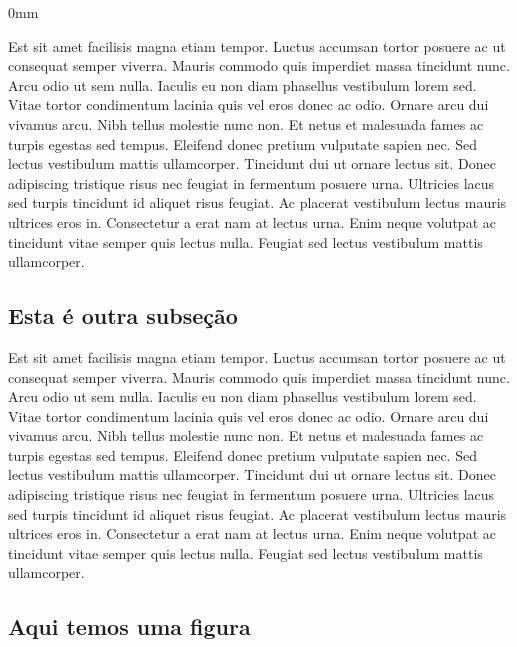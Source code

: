 \documentclass[./main.tex]{subfiles}
\begin{document}
\begin{adjustwidth}{\bodytab}{0mm}
\par Est sit amet facilisis magna etiam tempor. Luctus accumsan tortor posuere ac ut consequat semper viverra. Mauris commodo quis imperdiet massa tincidunt nunc. Arcu odio ut sem nulla. Iaculis eu non diam phasellus vestibulum lorem sed. Vitae tortor condimentum lacinia quis vel eros donec ac odio. Ornare arcu dui vivamus arcu. Nibh tellus molestie nunc non. Et netus et malesuada fames ac turpis egestas sed tempus. Eleifend donec pretium vulputate sapien nec. Sed lectus vestibulum mattis ullamcorper. Tincidunt dui ut ornare lectus sit. Donec adipiscing tristique risus nec feugiat in fermentum posuere urna. Ultricies lacus sed turpis tincidunt id aliquet risus feugiat. Ac placerat vestibulum lectus mauris ultrices eros in. Consectetur a erat nam at lectus urna. Enim neque volutpat ac tincidunt vitae semper quis lectus nulla. Feugiat sed lectus vestibulum mattis ullamcorper.

\subsection{Esta é outra subseção}  \label{chp1:sec1:sub2}

\par Est sit amet facilisis magna etiam tempor. Luctus accumsan tortor posuere ac ut consequat semper viverra. Mauris commodo quis imperdiet massa tincidunt nunc. Arcu odio ut sem nulla. Iaculis eu non diam phasellus vestibulum lorem sed. Vitae tortor condimentum lacinia quis vel eros donec ac odio. Ornare arcu dui vivamus arcu. Nibh tellus molestie nunc non. Et netus et malesuada fames ac turpis egestas sed tempus. Eleifend donec pretium vulputate sapien nec. Sed lectus vestibulum mattis ullamcorper. Tincidunt dui ut ornare lectus sit. Donec adipiscing tristique risus nec feugiat in fermentum posuere urna. Ultricies lacus sed turpis tincidunt id aliquet risus feugiat. Ac placerat vestibulum lectus mauris ultrices eros in. Consectetur a erat nam at lectus urna. Enim neque volutpat ac tincidunt vitae semper quis lectus nulla. Feugiat sed lectus vestibulum mattis ullamcorper.

\subsection{Aqui temos uma figura}  \label{chp1:sec1:sub3}


\end{adjustwidth}
\end{document}
